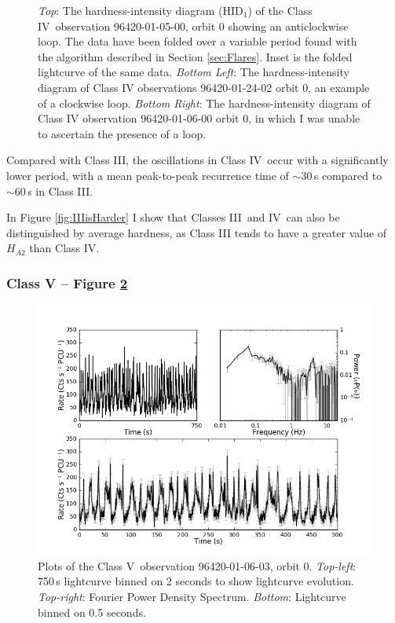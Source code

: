 \begin{figure}
    \captionsetup{singlelinecheck=off}
    \caption[The hardness-intensity diagram of the Class IV observation 96420-01-05-00, showing an anticlockwise loop.]{\textit{Top}: The hardness-intensity diagram (HID$_1$) of the Class IV\indexiv\ observation 96420-01-05-00, orbit 0 showing an anticlockwise loop.  The data have been folded over a variable period found with the algorithm described in Section \ref{sec:Flares}.  Inset is the folded lightcurve of the same data.  \textit{Bottom Left}: The hardness-intensity diagram of Class IV observations 96420-01-24-02 orbit 0, an example of a clockwise loop.  \textit{Bottom Right}: The hardness-intensity diagram of Class IV observation 96420-01-06-00 orbit 0, in which I was unable to ascertain the presence of a loop.}
   \label{fig:LoopIV}
\end{figure}

\par Compared with Class III\indexiii, the oscillations in Class IV\indexiv\ occur with a significantly lower period, with a mean peak-to-peak recurrence time of $\sim30$\,s compared to $\sim60$\,s in Class III.
\par In Figure \ref{fig:IIIisHarder} I show that Classes III\indexiii\ and IV\indexiv\ can also be distinguished by average hardness, as Class III tends to have a greater value of $H_{A2}$ than Class IV.

\subsubsection{Class V -- Figure \ref{fig:Kmulti}}
\label{sec:classV}

\begin{figure}
    \includegraphics[width=0.8\columnwidth, trim = 0.6cm 0 3.9cm 0]{images/Kmulti.png}
    \captionsetup{singlelinecheck=off}
    \caption[Characteristic lightcurves and a power spectrum of Class V variability.]{Plots of the Class V\indexv\ observation 96420-01-06-03, orbit 0.  \textit{Top-left}: 750\,s lightcurve binned on 2 seconds to show lightcurve evolution.  \textit{Top-right}: Fourier Power Density Spectrum. \textit{Bottom}: Lightcurve binned on 0.5 seconds.}
   \label{fig:Kmulti}
\end{figure}

